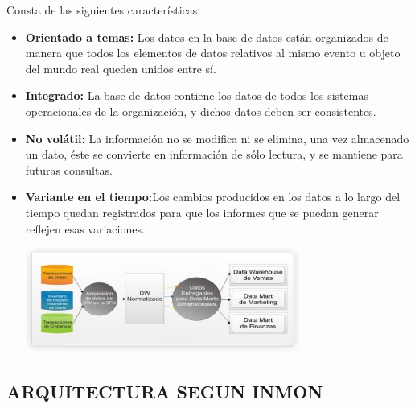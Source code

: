 \documentclass[%
 reprint,
 amsmath,amssymb,
 aps,
]{revtex4-1}
\begin{document}
Consta de las siguientes características:
\begin{itemize}
		\item \textbf{Orientado a temas:} Los datos en la base de datos están organizados de manera que todos los elementos de datos relativos al mismo evento u objeto del mundo real queden unidos entre sí.
		\item \textbf{Integrado:} La base de datos contiene los datos de todos los sistemas operacionales de la organización, y dichos datos deben ser consistentes. 
		
		\item \textbf{No volátil:} La información no se modifica ni se elimina, una vez almacenado un dato, éste se convierte en información de sólo lectura, y se 	mantiene para futuras consultas.
		\item \textbf{Variante en el tiempo:}Los cambios producidos en los datos a lo largo del tiempo quedan registrados para que los informes que se puedan generar reflejen esas variaciones.

	\begin{center}
					\includegraphics[width=9cm]{./IMAGENES/imgleydi2}
				\end{center}
\end{itemize}




\subsection{ARQUITECTURA SEGUN INMON}
\begin{figure}[htb]
			
			\end{figure}
\end{document}
